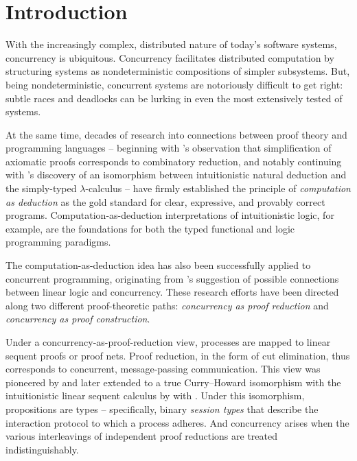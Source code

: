 \chapter{Introduction}\label{ch:introduction}

With the increasingly complex, distributed nature of today's software systems, concurrency is ubiquitous.
Concurrency facilitates distributed computation by structuring systems as nondeterministic compositions of simpler subsystems.
But, being nondeterministic, concurrent systems are notoriously difficult to get right: 
subtle races and deadlocks can be lurking in even the most extensively tested of systems.

At the same time, decades of research into connections between proof theory and programming languages -- beginning with \citeauthor{Curry:PNAS34}'s observation that simplification of axiomatic proofs corresponds to combinatory reduction\autocite{Curry:PNAS34}, and notably continuing with \citeauthor{Howard:69}'s discovery of an isomorphism between intuitionistic natural deduction and the simply-typed $\lambda$-calculus\autocite{Howard:69} -- have firmly established the principle of \emph{computation as deduction} as the gold standard for clear, expressive, and provably correct programs.
Computation-as-deduction interpretations of intuitionistic logic, for example, are the foundations for both the typed functional\autocite{Martin-Lof:LMPS80} and logic\autocites{Miller+:PAL91}{Andreoli:JLC92} programming paradigms.

The computation-as-deduction idea has also been successfully applied to concurrent programming, originating from \citeauthor{Girard:TCS87}'s suggestion of possible connections between linear logic and concurrency\autocite{Girard:TCS87}.
These research efforts have been directed along two different proof-theoretic paths: \emph{concurrency as proof reduction} and \emph{concurrency as proof construction}.


Under a concurrency-as-proof-reduction view, processes are mapped to linear sequent proofs or proof nets.
Proof reduction, in the form of cut elimination, thus corresponds to concurrent, message-passing communication.
This view was pioneered by \textcite{Abramsky:TCS93} and later extended to a true Curry--Howard isomorphism with the intuitionistic linear sequent calculus by \citeauthor{Caires+Pfenning:CONCUR10} with \citeauthor{Toninho:CMU15}\autocites{Caires+Pfenning:CONCUR10}{Caires+:TLDI12}{Caires+:MSCS16}.
Under this isomorphism, propositions are types -- specifically, binary \emph{session types}\autocite{Honda:CONCUR93} that describe the interaction protocol to which a process adheres.
And concurrency arises when the various interleavings of independent proof reductions are treated indistinguishably.


